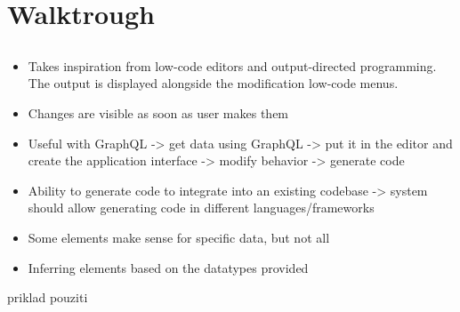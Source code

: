 \chapter{Walktrough}
\label{chap:waltrough}
\section{}
\begin{itemize}
	\item Takes inspiration from low-code editors and output-directed programming. The output is displayed alongside the modification low-code menus.
	\item Changes are visible as soon as user makes them
	\item Useful with GraphQL -> get data using GraphQL -> put it in the editor and create the application interface -> modify behavior -> generate code
	\item Ability to generate code to integrate into an existing codebase -> system should allow generating code in different languages/frameworks
	\item Some elements make sense for specific data, but not all
	\item Inferring elements based on the datatypes provided
\end{itemize}


priklad pouziti
